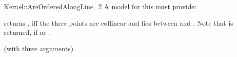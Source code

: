\begin{ccRefFunctionObjectConcept}{Kernel::AreOrderedAlongLine_2}
A model for this must provide:


         {returns , iff the three points are collinear and 
           lies between  and .
          Note that  is returned, if  or
          .}

\ccRefines
{} (with three arguments)

\ccSeeAlso
{}  \\

\end{ccRefFunctionObjectConcept}
